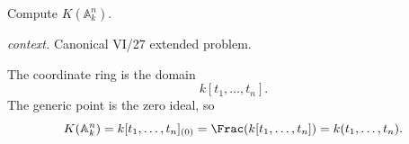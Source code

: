 \begin{problem}\label{prob:vi27-p14}
Compute \(K(\mathbb A^n_k)\).
\par\smallskip\noindent\textit{context.} Canonical VI/27 extended problem.
\end{problem}

\ifdefined\FullProblemDossiers
\begin{solution}
The coordinate ring is the domain
\[
k[t_1,\ldots,t_n].
\]
The generic point is the zero ideal, so
\[
K(\mathbb A^n_k)
=
k[t_1,\ldots,t_n]_{(0)}
=
\Frac(k[t_1,\ldots,t_n])
=
k(t_1,\ldots,t_n).
\]
\end{solution}
\fi

